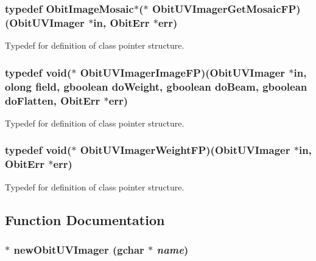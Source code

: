 \subsubsection{\setlength{\rightskip}{0pt plus 5cm}typedef {\bf Obit\-Image\-Mosaic}$\ast$($\ast$ {\bf Obit\-UVImager\-Get\-Mosaic\-FP})({\bf Obit\-UVImager} $\ast$in, {\bf Obit\-Err} $\ast$err)}\label{ObitUVImager_8h_a9}


Typedef for definition of class pointer structure. 

\subsubsection{\setlength{\rightskip}{0pt plus 5cm}typedef void($\ast$ {\bf Obit\-UVImager\-Image\-FP})({\bf Obit\-UVImager} $\ast$in, {\bf olong} field, gboolean do\-Weight, gboolean do\-Beam, gboolean do\-Flatten, {\bf Obit\-Err} $\ast$err)}\label{ObitUVImager_8h_a7}


Typedef for definition of class pointer structure. 

\subsubsection{\setlength{\rightskip}{0pt plus 5cm}typedef void($\ast$ {\bf Obit\-UVImager\-Weight\-FP})({\bf Obit\-UVImager} $\ast$in, {\bf Obit\-Err} $\ast$err)}\label{ObitUVImager_8h_a6}


Typedef for definition of class pointer structure. 



\subsection{Function Documentation}
\subsubsection{$\ast$ new\-Obit\-UVImager (gchar $\ast$ {\em name})}\label{ObitUVImager_8h_a12}


